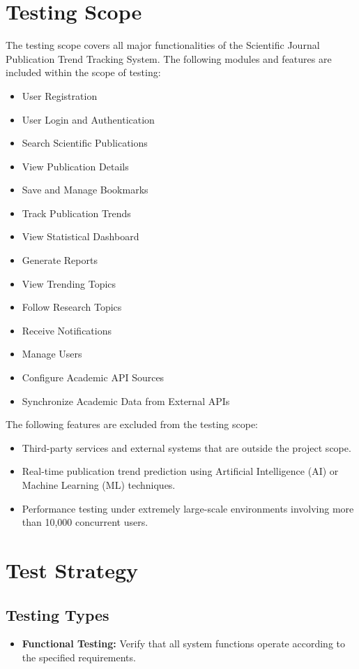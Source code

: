 \documentclass[12pt,a4paper]{article}
\begin{document}
{{\section{Testing Scope}
The testing scope covers all major functionalities of the Scientific Journal
Publication Trend Tracking System. The following modules and features are included
within the scope of testing:
\begin{itemize}
	\item User Registration
	\item User Login and Authentication
	\item Search Scientific Publications
	\item View Publication Details
	\item Save and Manage Bookmarks
	\item Track Publication Trends
	\item View Statistical Dashboard
	\item Generate Reports 
	\item View Trending Topics
	\item Follow Research Topics
	\item Receive Notifications
	\item Manage Users
	\item Configure Academic API Sources
	\item Synchronize Academic Data from External APIs
\end{itemize}
The following features are excluded from the testing scope:
\begin{itemize}
	\item Third-party services and external systems that are outside the project scope.
	\item Real-time publication trend prediction using Artificial Intelligence (AI)
	or Machine Learning (ML) techniques.
	\item Performance testing under extremely large-scale environments involving
	more than 10,000 concurrent users.
\end{itemize}

\section{Test Strategy}
\subsection{Testing Types}
\begin{itemize}
	\item \textbf{Functional Testing:} Verify that all system functions operate according to the specified requirements.
	

\end{itemize}}}
\end{document}
